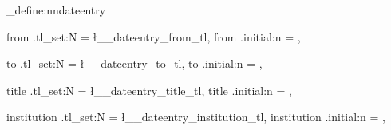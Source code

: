 












\ExplSyntaxOn

\keys_define:nn{dateentry}{
    from   .tl_set:N = \l__dateentry_from_tl,
    from   .initial:n = {},

    to     .tl_set:N = \l__dateentry_to_tl,
    to     .initial:n = {},

    title  .tl_set:N = \l__dateentry_title_tl,
    title  .initial:n = {},

    institution  .tl_set:N = \l__dateentry_institution_tl,
    institution  .initial:n = {},
}

\usepackage{tabularx}

